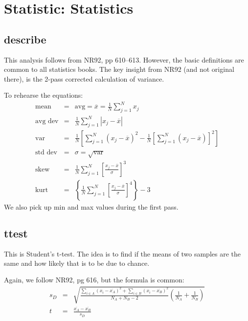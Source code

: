 \section{Statistic: Statistics}
\subsection*{describe}
This analysis follows from NR92, pp 610--613.  However, the basic definitions
are common to all statistics books.  The key insight from NR92 (and not
original there), is the 2-pass corrected calculation of variance.

To rehearse the equations:
\begin{eqnarray}
  \mbox{mean} & = & \mbox{avg} = \overline{x} = 
                    \frac{1}{N}\sum_{j=1}^{N}x_j\\
  \mbox{avg dev} & = & \frac{1}{N}\sum_{j=1}^{N}|x_j-\overline{x}|\\
  \mbox{var} & = & \frac{1}{N}\left [ \sum_{j=1}^{N}(x_j-\overline{x})^2
                   - \frac{1}{N} \left [ \sum_{j=1}^{N}(x_j
                       -\overline{x})\right]^2\right]\\
  \mbox{std dev} & =& \sigma  =  \sqrt{\mbox{var}}\\
  \mbox{skew} & = & \frac{1}{N}\sum_{j=1}^{N} 
                    \left [\frac{x_j-\overline{x}}{\sigma}\right]^3\\
  \mbox{kurt} & = & \left\{\frac{1}{N}\sum_{j=1}^{N} 
                    \left [\frac{x_j-\overline{x}}{\sigma}\right]^4
                    \right\} - 3
\end{eqnarray}
We also pick up min and max values during the first pass.

\subsection*{ttest}
This is Student's t-test.  The idea is to find if the means of 
two samples are the same and how likely that is to be due to chance.

Again, we follow NR92, pg 616, but the formula
is common:
\begin{eqnarray}
s_D & =  & \sqrt{\frac{\sum_{i\in A}(x_i-\overline{x_A})^2 
                      +\sum_{i\in B}(x_i-\overline{x_B})^2}
                      {N_A+N_B-2}
                 \left(\frac{1}{N_A}+\frac{1}{N_B}\right)
                }\\
t & = & \frac{\overline{x_A}-\overline{x_B}}{s_D}
\end{eqnarray}

